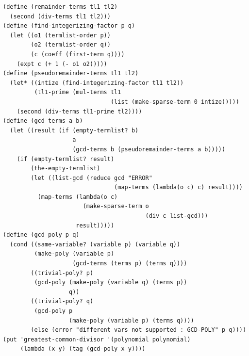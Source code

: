 \documentclass[final,fleqn,titlepage,twoside]{article}
\begin{document}
\begin{verbatim}
(define (remainder-terms tl1 tl2)
  (second (div-terms tl1 tl2)))
(define (find-integerizing-factor p q)
  (let ((o1 (termlist-order p))
        (o2 (termlist-order q))
        (c (coeff (first-term q))))
    (expt c (+ 1 (- o1 o2)))))
(define (pseudoremainder-terms tl1 tl2)
  (let* ((intize (find-integerizing-factor tl1 tl2))
         (tl1-prime (mul-terms tl1
                               (list (make-sparse-term 0 intize)))))
    (second (div-terms tl1-prime tl2))))
(define (gcd-terms a b)
  (let ((result (if (empty-termlist? b)
                    a
                    (gcd-terms b (pseudoremainder-terms a b)))))
    (if (empty-termlist? result)
        (the-empty-termlist)
        (let ((list-gcd (reduce gcd "ERROR"
                                (map-terms (lambda(o c) c) result))))
          (map-terms (lambda(o c)
                       (make-sparse-term o
                                         (div c list-gcd)))
                     result)))))
(define (gcd-poly p q)
  (cond ((same-variable? (variable p) (variable q))
         (make-poly (variable p)
                    (gcd-terms (terms p) (terms q))))
        ((trivial-poly? p)
         (gcd-poly (make-poly (variable q) (terms p))
                   q))
        ((trivial-poly? q)
         (gcd-poly p
                   (make-poly (variable p) (terms q))))
        (else (error "different vars not supported : GCD-POLY" p q))))
(put 'greatest-common-divisor '(polynomial polynomial)
     (lambda (x y) (tag (gcd-poly x y))))
\end{verbatim}
\end{document}

